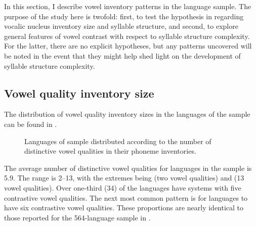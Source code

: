   In this section, I describe vowel inventory patterns in the language sample. The purpose of the study here is twofold: first, to test the hypothesis in  regarding vocalic nucleus inventory size and syllable structure, and second, to explore general features of vowel contrast with respect to syllable structure complexity. For the latter, there are no explicit hypotheses, but any patterns uncovered will be noted in the event that they might help shed light on the development of syllable structure complexity.

\subsection{Vowel quality inventory size}\label{sec:4.3.1}

  The distribution of vowel quality inventory sizes in the languages of the sample can be found in .


\begin{figure}
\caption{\label{fig:4.1}Languages of sample distributed according to the number of distinctive vowel qualities in their phoneme inventories.}
\end{figure}

  The average number of distinctive vowel qualities for languages in the sample is 5.9. The range is 2--13, with the extremes being  (two vowel qualities) and  (13 vowel qualities). Over one-third (34) of the languages have systems with five contrastive vowel qualities. The next most common pattern is for languages to have six contrastive vowel qualities. These proportions are nearly identical to those reported for the 564-language sample in \citet{Maddieson2013c}.


